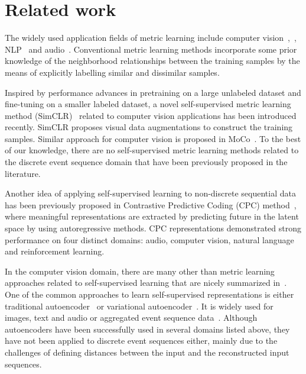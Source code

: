 \documentclass{article}
\begin{document}
\section{Related work} \label{sec-rel-work}

The widely used application fields of metric learning include computer vision~\cite{Chopra2005LearningAS},~\cite{Schroff2015FaceNetAU},  NLP~\cite{Reimers2019SentenceBERTSE} and audio~\cite{Wan2018GeneralizedEL}. Conventional metric learning methods incorporate some prior knowledge of the neighborhood relationships between the training samples by the means of explicitly labelling similar and dissimilar samples.

Inspired by performance advances in pretraining on a large unlabeled dataset and fine-tuning on a smaller labeled dataset, a novel self-supervised metric learning method (SimCLR)~\cite{Chen2020ASF} related to computer vision applications has been introduced recently. SimCLR proposes visual data augmentations to construct the training samples. Similar approach for computer vision is proposed in MoCo~\cite{He2019MomentumCF}. To the best of our knowledge, there are no self-supervised metric learning methods related to the discrete event sequence domain that have been previously proposed in the literature.

Another idea of applying self-supervised learning to non-discrete sequential data has been previously proposed in Contrastive Predictive Coding (CPC) method~\cite{Oord2018RepresentationLW}, where meaningful representations are extracted by predicting future in the latent space by using autoregressive methods. CPC representations demonstrated strong performance on four distinct domains: audio, computer vision, natural language and reinforcement learning. 

In the computer vision domain, there are many other than metric learning approaches related to self-supervised learning that are nicely summarized in~\cite{Jing2020SelfsupervisedVF}.
One of the common approaches to learn self-supervised representations is either traditional autoencoder~\cite{Rumelhart1986LearningIR} or variational autoencoder~\cite{Kingma2014AutoEncodingVB}. It is widely used for images, text and audio or aggregated event sequence data~\cite{Mancisidor2019LearningLR}. Although autoencoders have been successfully used in several domains listed above, they have not been applied to discrete event sequences either, mainly due to the challenges of defining distances between the input and the reconstructed input sequences.
\end{document}

